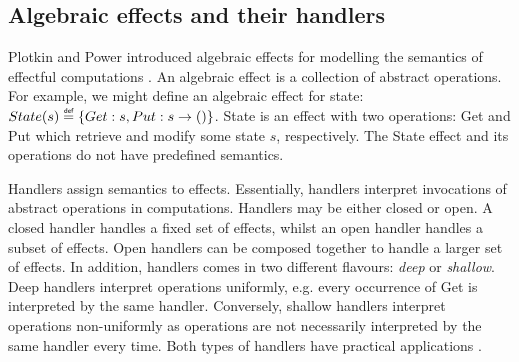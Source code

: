 \documentclass[preprint,10pt,numbers]{sigplanconf}
\newcommand{\defas}[0]{\mathrel{\overset{\makebox[0pt]{\mbox{\normalfont\tiny\sffamily def}}}{=}}} %
\begin{document}
\subsection{Algebraic effects and their handlers}\label{sec:effects-and-handlers}
Plotkin and Power introduced algebraic effects \cite{Plotkin2001} for modelling the semantics of effectful computations \cite{Lindley2014}. An algebraic effect is a collection of abstract operations. For example, we might define an algebraic effect for state: $State(s) \defas \{Get:s,Put:s \to ()\}$. State is an effect with two operations: Get and Put which retrieve and modify some state $s$, respectively. The State effect and its operations do not have predefined semantics.



Handlers assign semantics to effects. Essentially, handlers interpret invocations of abstract operations in computations. Handlers may be either closed or open. A closed handler handles a fixed set of effects, whilst an open handler handles a subset of effects. Open handlers can be composed together to handle a larger set of effects. In addition, handlers comes in two different flavours: \emph{deep} or \emph{shallow}. Deep handlers interpret operations uniformly, e.g. every occurrence of Get is interpreted by the same handler. Conversely, shallow handlers interpret operations non-uniformly as operations are not necessarily interpreted by the same handler every time. Both types of handlers have practical applications \cite{Kammar2013}.
\end{document}
